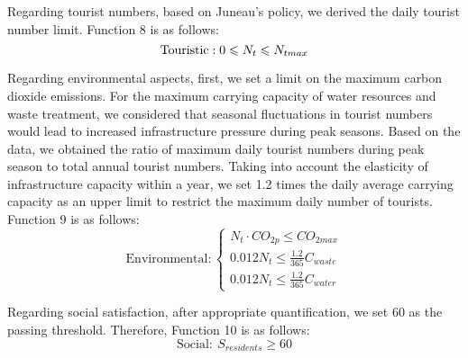 \documentclass[12pt]{article}  %
\begin{document}
Regarding tourist numbers, based on Juneau's policy\cite{6}, we derived the daily tourist number limit. Function 8 is as follows:
\begin{equation}
	\text{Touristic}:
		0\leqslant N_{t}\leqslant N_{tmax}\\
\end{equation}

Regarding environmental aspects, first, we set a limit on the maximum carbon dioxide emissions. For the maximum carrying capacity of water resources and waste treatment, we considered that seasonal fluctuations in tourist numbers would lead to increased infrastructure pressure during peak seasons. Based on the data, we obtained the ratio of maximum daily tourist numbers during peak season to total annual tourist numbers. Taking into account the elasticity of infrastructure capacity within a year, we set 1.2 times the daily average carrying capacity as an upper limit to restrict the maximum daily number of tourists. Function 9 is as follows:
\begin{equation}
	\text{Environmental}:
	\begin{cases}
		N_{t}\cdot CO_{2p}\leqslant CO_{2max} \\
		0.012N_t\leqslant \frac{1.2}{365}C_{waste} \\
		0.012N_t\leqslant \frac{1.2}{365}C_{water}
	\end{cases}
\end{equation}

Regarding social satisfaction, after appropriate quantification, we set 60 as the passing threshold. Therefore, Function 10 is as follows:
\begin{equation}
	\text{Social}:\ S_{residents} \geqslant 60
\end{equation}	
\end{document}
